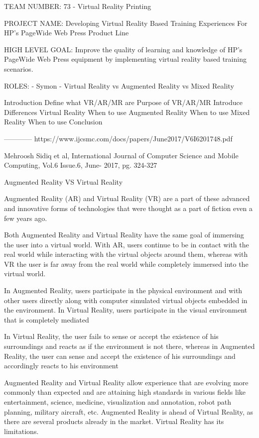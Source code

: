 TEAM NUMBER: 73 - Virtual Reality Printing 

PROJECT NAME: Developing Virtual Reality Based Training Experiences For HP's PageWide Web Press Product Line

HIGH LEVEL GOAL: Improve the quality of learning and knowledge of HP's PageWide Web Press equipment by implementing virtual reality based training scenarios.

ROLES: 
    - Symon
        - Virtual Reality vs Augmented Reality vs Mixed Reality
        
        

Introduction
    Define what VR/AR/MR are
    Purpose of VR/AR/MR
    Introduce Differences
Virtual Reality
    When to use 
Augmented Reality 
    When to use
Mixed Reality
    When to use
Conclusion


------------
https://www.ijcsmc.com/docs/papers/June2017/V6I6201748.pdf

Mehroosh Sidiq et al, International Journal of Computer Science and Mobile Computing, Vol.6 Issue.6, June- 2017, pg. 324-327

Augmented Reality VS Virtual Reality

Augmented Reality (AR) and Virtual Reality (VR) are a part of these advanced and innovative forms
of technologies that were thought as a part of fiction even a few years ago.

Both Augmented Reality and Virtual Reality have the same goal of immersing the user into a virtual world. With
AR, users continue to be in contact with the real world while interacting with the virtual objects around them,
whereas with VR the user is far away from the real world while completely immersed into the virtual world.


In Augmented Reality, users participate in the physical environment and with other users directly along with
computer simulated virtual objects embedded in the environment. In Virtual Reality, users participate in the visual
environment that is completely mediated

In Virtual Reality, the user fails to sense or accept the existence of his surroundings and
reacts as if the environment is not there, whereas in Augmented Reality, the user can sense and accept the existence
of his surroundings and accordingly reacts to his environment

Augmented Reality and Virtual Reality allow experience that are evolving more commonly than expected and are
attaining high standards in various fields like entertainment, science, medicine, visualization and annotation, robot
path planning, military aircraft, etc.
Augmented Reality is ahead of Virtual Reality, as there are several products already in the market. Virtual Reality
has its limitations. 


